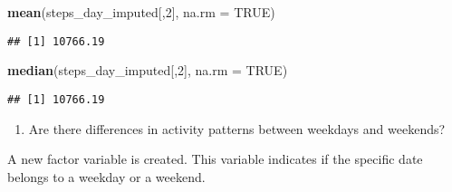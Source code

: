 \documentclass[]{article}
\newenvironment{Shaded}{\begin{snugshade}}{\end{snugshade}}
\newcommand{\KeywordTok}[1]{\textcolor[rgb]{0.13,0.29,0.53}{\textbf{#1}}}
\newcommand{\DataTypeTok}[1]{\textcolor[rgb]{0.13,0.29,0.53}{#1}}
\newcommand{\DecValTok}[1]{\textcolor[rgb]{0.00,0.00,0.81}{#1}}
\newcommand{\StringTok}[1]{\textcolor[rgb]{0.31,0.60,0.02}{#1}}
\newcommand{\OtherTok}[1]{\textcolor[rgb]{0.56,0.35,0.01}{#1}}
\newcommand{\ControlFlowTok}[1]{\textcolor[rgb]{0.13,0.29,0.53}{\textbf{#1}}}
\newcommand{\OperatorTok}[1]{\textcolor[rgb]{0.81,0.36,0.00}{\textbf{#1}}}
\newcommand{\NormalTok}[1]{#1}
\providecommand{\tightlist}{%
  \setlength{\itemsep}{0pt}\setlength{\parskip}{0pt}}
\begin{document}
\begin{Shaded}
\begin{Highlighting}[]
\KeywordTok{mean}\NormalTok{(steps_day_imputed[,}\DecValTok{2}\NormalTok{], }\DataTypeTok{na.rm =} \OtherTok{TRUE}\NormalTok{)}
\end{Highlighting}
\end{Shaded}

\begin{verbatim}
## [1] 10766.19
\end{verbatim}

\begin{Shaded}
\begin{Highlighting}[]
\KeywordTok{median}\NormalTok{(steps_day_imputed[,}\DecValTok{2}\NormalTok{], }\DataTypeTok{na.rm =} \OtherTok{TRUE}\NormalTok{)}
\end{Highlighting}
\end{Shaded}

\begin{verbatim}
## [1] 10766.19
\end{verbatim}

\begin{enumerate}
\def\labelenumi{\arabic{enumi})}
\setcounter{enumi}{4}
\tightlist
\item
  Are there differences in activity patterns between weekdays and
  weekends?
\end{enumerate}

A new factor variable is created. This variable indicates if the
specific date belongs to a weekday or a weekend.

\begin{Shaded}
\end{Shaded}
\end{document}

